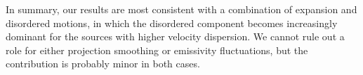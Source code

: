 \documentclass[fleqn,usenatbib, useAMS, a4paper]{mnras}
\newcommand\pos{\ensuremath{_{\mathrm{pos}}}}
\begin{document}
In summary, our results are most consistent with a combination
of expansion and disordered motions, in which the disordered component
becomes increasingly dominant for the sources with higher velocity dispersion.
We cannot rule out a role for either projection smoothing or emissivity fluctuations,
but the contribution is probably minor in both cases. 







\end{document}
